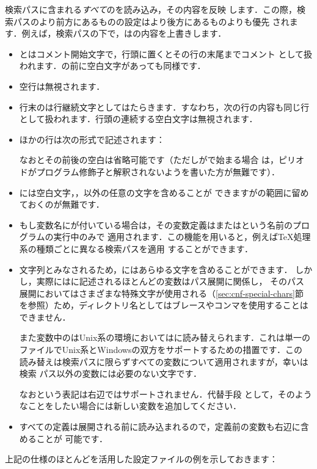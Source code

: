 \documentclass[uplatex,dvipdfmx,tombow]{jsarticle}
\begin{document}
\KPS 検索パスに含まれる\emph{すべて}のを読み込み，その内容を反映
します．この際，検索パスのより前方にあるものの設定はより後方にあるものよりも優先
されます．例えば，検索パスの下で，はの内容を上書きします．

\begin{itemize}
\item \code{\%}と\code{\#}はコメント開始文字で，行頭に置くとその行の末尾までコメント
  として扱われます．\code{\%}の前に空白文字があっても同様です．
\item 空行は無視されます．
\item 行末の\code{\bs}は行継続文字としてはたらきます．すなわち，次の行の内容も同じ行
  として扱われます．行頭の連続する空白文字は無視されます．
\item ほかの行は次の形式で記述されます：
%
\begin{alltt}
   \optional{=} 
\end{alltt}
%
  なお\samp{=}とその前後の空白は省略可能です（ただしがで始まる場合
  は，ピリオドがプログラム修飾子と解釈されないよう\samp{=}を書いた方が無難です）．
\item {}には空白文字，\samp{=}，以外の任意の文字を含めることが
  できますがの範囲に留めておくのが無難です．
\item もし変数名にが付いている場合は，その変数定義はまたはという名前のプログラムの実行中のみで
  適用されます．この機能を用いると，例えば\TeX 処理系の種類ごとに異なる検索パスを適用
  することができます．
\item 文字列とみなされるため，にはあらゆる文字を含めることができます．
  しかし，実際にはに記述されるほとんどの変数はパス展開に関係し，
  そのパス展開においてはさまざまな特殊文字が使用される（\ref{sec:cnf-special-chars}節
  を参照）ため，ディレクトリ名としてはブレースやコンマを使用することはできません．
  
  また変数中の\samp{;}はUnix系の環境においては\samp{:}に読み替えられます．これは単一の
  ファイルでUnix系とWindowsの双方をサポートするための措置です．この
  読み替えは検索パスに限らずすべての変数について適用されますが，幸い\samp{;}は検索
  パス以外の変数には必要のない文字です．
  
  なおという表記は右辺ではサポートされません．代替手段
  として，そのようなことをしたい場合には新しい変数を追加してください．
\item すべての定義は展開される前に読み込まれるので，定義前の変数も右辺に含めることが
  可能です．
\end{itemize}
%
上記の仕様のほとんどを活用した設定ファイルの例を示しておきます：
%

\end{document}
